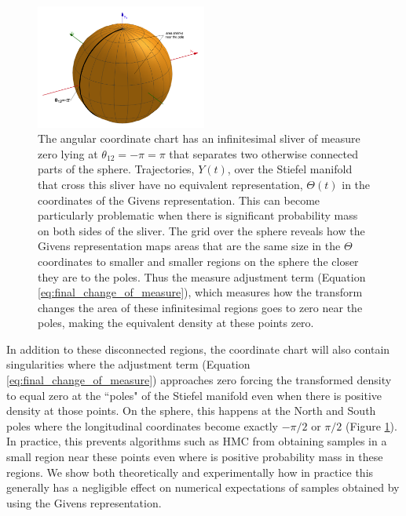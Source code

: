 \documentclass[ba]{imsart}
\numberwithin{equation}{section}
\theoremstyle{plain}
\begin{document}
\begin{figure}[h]
\centering
\vspace{.1in}
\includegraphics[width=0.5\textwidth]{figures/sliver_globe.png}
\vspace{.05in}
\caption{The angular coordinate chart has an infinitesimal sliver of measure zero lying at $\theta_{12} = -\pi = \pi$ that separates two otherwise connected parts of the sphere. Trajectories, $Y(t)$, over the Stiefel manifold that cross this sliver have no equivalent representation, $\Theta(t)$ in the coordinates of the Givens representation. This can become particularly problematic when there is significant probability mass on both sides of the sliver. The grid over the sphere reveals how the Givens representation maps areas that are the same size in the $\Theta$ coordinates to smaller and smaller regions on the sphere the closer they are to the poles. Thus the measure adjustment term (Equation \ref{eq:final_change_of_measure}), which measures how the transform changes the area of these infinitesimal regions goes to zero near the poles, making the equivalent density at these points zero.}
\label{fig:pathologies}
\end{figure}

\noindent In addition to these disconnected regions, the coordinate chart will also contain singularities where the adjustment term (Equation \ref{eq:final_change_of_measure}) approaches zero forcing the transformed density to equal zero at the ``poles" of the Stiefel manifold even when there is positive density at those points. On the sphere, this happens at the North and South poles where the longitudinal coordinates become exactly $-\pi/2$ or $\pi/2$ (Figure \ref{fig:pathologies}). In practice, this prevents algorithms such as HMC from obtaining samples in a small region near these points even where is positive probability mass in these regions. We show both theoretically and experimentally how in practice this generally has a negligible effect on numerical expectations of samples obtained by using the Givens representation.
\end{document}
